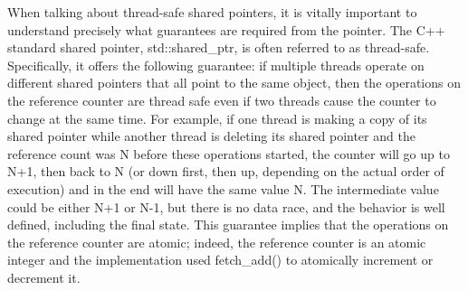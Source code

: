 When talking about thread-safe shared pointers, it is vitally important to understand precisely what guarantees are required from the pointer. The C++ standard shared pointer, std::shared\_ptr, is often referred to as thread-safe. Specifically, it offers the following guarantee: if multiple threads operate on different shared pointers that all point to the same object, then the operations on the reference counter are thread safe even if two threads cause the counter to change at the same time. For example, if one thread is making a copy of its shared pointer while another thread is deleting its shared pointer and the reference count was N before these operations started, the counter will go up to N+1, then back to N (or down first, then up, depending on the actual order of execution) and in the end will have the same value N. The intermediate value could be either N+1 or N-1, but there is no data race, and the behavior is well defined, including the final state. This guarantee implies that the operations on the reference counter are atomic; indeed, the reference counter is an atomic integer and the implementation used fetch\_add() to atomically increment or decrement it.

